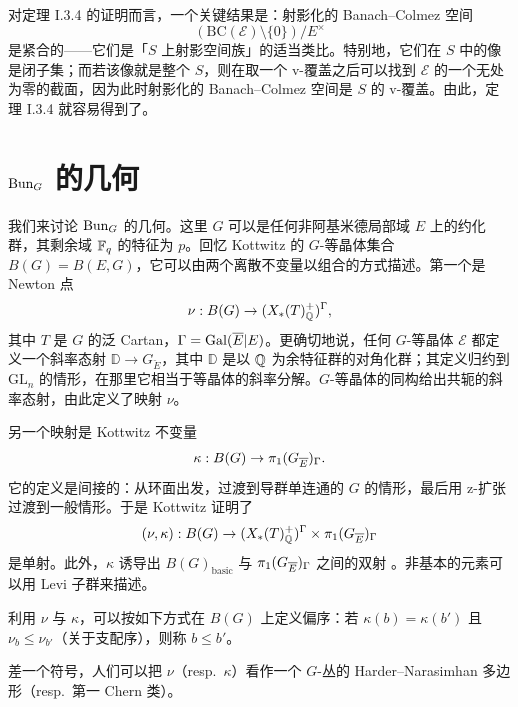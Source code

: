 对定理 I.3.4 的证明而言，一个关键结果是：射影化的 Banach–Colmez 空间
\[
  (\mathrm{BC}(\mathcal{E})\setminus\{0\})/E^\times
\]
是紧合的——它们是「$S$ 上射影空间族」的适当类比。特别地，它们在 $S$ 中的像是闭子集；而若该像就是整个 $S$，则在取一个 v-覆盖之后可以找到 $\mathcal{E}$ 的一个无处为零的截面，因为此时射影化的 Banach–Colmez 空间是 $S$ 的 v-覆盖。由此，定理 I.3.4 就容易得到了。

\section{$\mathrm{Bun}_G$ 的几何}%

我们来讨论 $\mathrm{Bun}_G$ 的几何。这里 $G$ 可以是任何非阿基米德局部域 $E$ 上的约化群，其剩余域 $\mathbb{F}_q$ 的特征为 $p$。回忆 Kottwitz 的 $G$-等晶体集合 $B(G)=B(E,G)$，它可以由两个离散不变量以组合的方式描述。第一个是 Newton 点
\[
  \nu : B(G)\to(X_*(T)^+_{\mathbb{Q}})^\Gamma,
\]
其中 $T$ 是 $G$ 的泛 Cartan，$\Gamma=\operatorname{Gal}(\overline{E}|E)$。更确切地说，任何 $G$-等晶体 $\mathcal{E}$ 都定义一个斜率态射 $\mathbb{D}\to G_{\breve{E}}$，其中 $\mathbb{D}$ 是以 $\mathbb{Q}$ 为余特征群的对角化群；其定义归约到 $\mathrm{GL}_n$ 的情形，在那里它相当于等晶体的斜率分解。$G$-等晶体的同构给出共轭的斜率态射，由此定义了映射 $\nu$。

另一个映射是 Kottwitz 不变量
\[
  \kappa : B(G)\to\pi_1(G_{\overline{E}})_\Gamma.
\]
它的定义是间接的：从环面出发，过渡到导群单连通的 $G$ 的情形，最后用 z-扩张过渡到一般情形。于是 Kottwitz 证明了
\[
  (\nu,\kappa) : B(G)\to(X_*(T)^+_{\mathbb{Q}})^\Gamma\times\pi_1(G_{\overline{E}})_\Gamma
\]
是单射。此外，$\kappa$ 诱导出 $B(G)_{\mathrm{basic}}$ 与 $\pi_1(G_{\overline{E}})_\Gamma$ 之间的双射
。非基本的元素可以用 Levi 子群来描述。

利用 $\nu$ 与 $\kappa$，可以按如下方式在 $B(G)$ 上定义偏序：若 $\kappa(b)=\kappa(b')$ 且 $\nu_b\le\nu_{b'}$（关于支配序），则称 $b\le b'$。

差一个符号，人们可以把 $\nu$（resp.\ $\kappa$）看作一个 $G$-丛的 Harder–Narasimhan 多边形（resp.\ 第一 Chern 类）。

